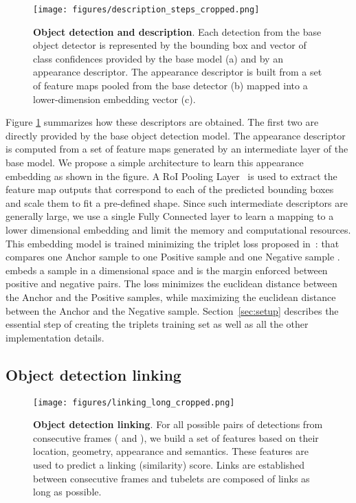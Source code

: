 \documentclass[letterpaper, 10 pt, conference]{ieeeconf}
\begin{document}
\begin{figure}[!tb]
\centering
\texttt{[image: figures/description\_steps\_cropped.png]}
\caption{
\textbf{Object detection and description}. 
Each detection from the base object detector is represented by the bounding box and vector of class confidences provided by the base model (a) and by an appearance descriptor. 
The appearance descriptor is built from a set of feature maps pooled from the base detector (b) mapped into a lower-dimension embedding vector (c). 
}
\label{fig:descriptors}
\end{figure}

Figure \ref{fig:descriptors} summarizes how these descriptors are obtained. The first two are directly provided by the base object detection model. The appearance descriptor is computed from a set of feature maps generated by an intermediate layer of the base model. 
We propose a simple architecture to learn this appearance embedding as shown in the figure. A RoI Pooling Layer~\cite{ren2015faster} is used to extract 
the feature map outputs that correspond to each of the predicted bounding boxes and scale them to fit a pre-defined shape. 
Since such intermediate descriptors are generally large, we use a single Fully Connected layer to learn a mapping to a lower dimensional embedding and limit the memory and computational resources. 
This embedding model is trained minimizing the triplet loss proposed in~\cite{Schroff_2015_CVPR}:
\noindent that compares one Anchor sample  to one Positive sample  and one Negative sample . 
 embeds a sample  in a  dimensional space and  is the margin enforced between positive and
negative pairs.
The loss minimizes the euclidean distance between the Anchor and the Positive samples, while maximizing the euclidean distance between the Anchor and the Negative sample.  Section~\ref{sec:setup} 
describes the essential step of creating the triplets training set as well as all the other implementation details.


\subsection{Object detection linking}
\label{sec:objlinking}

\begin{figure}[!tb]
\centering
\texttt{[image: figures/linking\_long\_cropped.png]}
\caption{
\textbf{Object detection linking}.
For all possible pairs of detections from consecutive frames ( and ), we build a set of features based on their location, geometry, appearance and semantics. These features are used to predict a linking (similarity) score. Links are established between consecutive frames and tubelets are composed of links as long as possible.
}
\label{fig:linking}
\end{figure}
\end{document}
